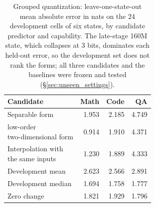 \begin{table}[!htbp]\normalfont\centering\footnotesize
\begin{tabular*}{\textwidth}{@{\extracolsep{\fill}}lrrr@{}}
\toprule
Candidate & Math & Code & QA \\
\midrule
Separable form & 1.953 & 2.185 & 4.749 \\
\shortstack[l]{low-order\\two-dimensional form} & 0.914 & 1.910 & 4.371 \\
\shortstack[l]{Interpolation with\\the same inputs} & 1.230 & 1.889 & 4.333 \\
Development mean & 2.623 & 2.566 & 2.891 \\
Development median & 1.694 & 1.758 & 1.777 \\
Zero change & 1.821 & 1.929 & 1.796 \\
\bottomrule\end{tabular*}
\caption{Grouped quantization: leave-one-state-out mean absolute error in nats on the 24 development cells of six states, by candidate predictor and capability. The late-stage 160M state, which collapses at 3 bits, dominates each \mbox{held-out} error, so the development set does not rank the forms; all three candidates and the baselines were frozen and tested (\S\ref{sec:unseen_settings}).}
\label{tab:v55_loso}\end{table}
